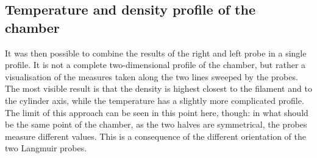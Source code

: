 \subsection{Temperature and density profile of the chamber}
It was then possible to combine the results of the right and left probe in a single profile. It is not a complete two-dimensional profile of the chamber, but rather a visualisation of the measures taken along the two lines sweeped by the probes.
The most visible result is that the density is highest closest to the filament and to the cylinder axis, while the temperature has a slightly more complicated profile.
The limit of this approach can be seen in this point here, though: in what should be the same point of the chamber, as the two halves are symmetrical, the probes measure different values. This is a consequence of the different orientation of the two Langmuir probes.